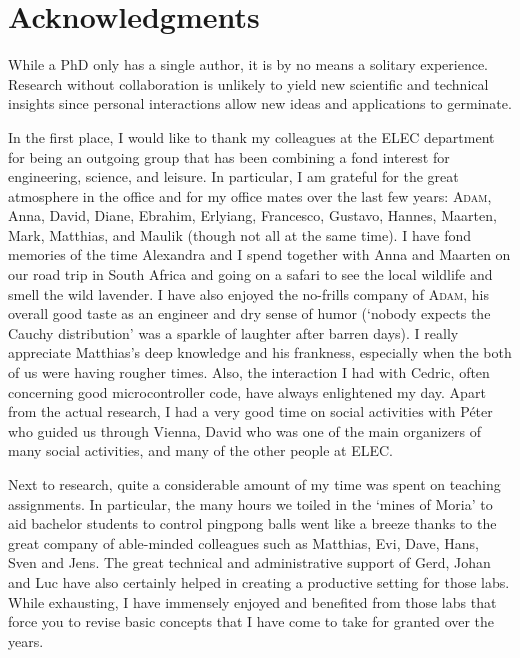 \chapter*{Acknowledgments}
\vspace{-1em}
\vspace{-1.5em}

{
\small
\sffamily

While a PhD only has a single author, it is by no means a solitary experience.
Research without collaboration is unlikely to yield new scientific and technical insights since personal interactions allow new ideas and applications to germinate.

In the first place, I would like to thank my colleagues at the ELEC department for being an outgoing group that has been combining a fond interest for engineering, science, and leisure.
In particular, I am grateful for the great atmosphere in the office and for my office mates over the last few years: \textsc{Adam}, Anna, David, Diane, Ebrahim, Erlyiang, Francesco, Gustavo, Hannes, Maarten, Mark, Matthias, and Maulik (though not all at the same time).
I have fond memories of the time Alexandra and I spend together with Anna and Maarten on our road trip in South Africa and going on a safari to see the local wildlife and smell the wild lavender.
I have also enjoyed the no-frills company of \textsc{Adam}, his overall good taste as an engineer and dry sense of humor (`nobody expects the Cauchy distribution' was a sparkle of laughter after barren days).
I really appreciate Matthias's deep knowledge and his frankness, especially when the both of us were having rougher times.
Also, the interaction I had with Cedric, often concerning good microcontroller code, have always enlightened my day.
Apart from the actual research, I had a very good time on social activities with Péter who guided us through Vienna, David who was one of the main organizers of many social activities, and many of the other people at ELEC.

Next to research, quite a considerable amount of my time was spent on teaching assignments.
In particular, the many hours we toiled in the `mines of Moria' to aid bachelor students to control pingpong balls went like a breeze thanks to the great company of able-minded colleagues such as Matthias, Evi, Dave, Hans, Sven and Jens.
The great technical and administrative support of Gerd, Johan and Luc have also certainly helped in creating a productive setting for those labs.
While exhausting, I have immensely enjoyed and benefited from those labs that force you to revise basic concepts that I have come to take for granted over the years.

}
